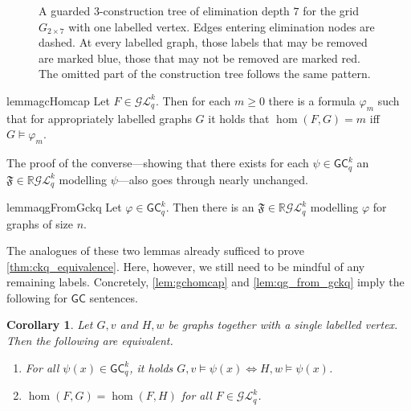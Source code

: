 \documentclass[10pt,a4paper]{article}
\newtheorem{corollary}[theorem]{Corollary}
\newcommand{\R}{\ensuremath{\mathbb{R}}}
\newcommand{\Lkq}{\ensuremath{\mathcal{L}_{q}^{k}}}
\newcommand{\GEkq}{\ensuremath{\mathcal{G}\Lkq}}
\newcommand{\lGC}{\ensuremath{\mathsf{GC}}}
\newcommand{\qg}[1]{\ensuremath{\mathfrak{#1}}} \newcommand{\qgp}[3]{\ensuremath{\mathfrak{#1}[#3; #2]}}
\newcommand{\grid}[2]{\ensuremath{G_{#1 \times #2}}}
\begin{document}
\begin{figure}
  \caption{A guarded $3$-construction tree of elimination depth $7$ for the grid $\grid{2}{7}$ with one labelled vertex. Edges entering elimination nodes are dashed. At every labelled graph, those labels that may be removed are marked blue, those that may not be removed are marked red. The omitted part of the construction tree follows the same pattern.}
  \label{fig:guard-elim-example}
\end{figure}

 


\begin{restatable}{lemma}{gcHomcap}\label{lem:gchomcap}
  Let $F \in \GEkq$. Then for each $m \geq 0$ there is a formula $\varphi_m$ such that for appropriately labelled graphs $G$ it holds that $\hom(F, G) = m$ iff $G \models \varphi_m$.
\end{restatable}

  The proof of the converse---showing that there exists for each $\psi \in \lGC^k_q$ an $\qg{F} \in \R\GEkq$ modelling $\psi$---also goes through nearly unchanged.

\begin{restatable}{lemma}{qgFromGckq}\label{lem:qg_from_gckq}
  Let $\varphi \in \lGC^k_q$. Then there is an $\qg{F} \in \R\GEkq$ modelling $\varphi$ for graphs of size $n$.
\end{restatable}

The analogues of these two lemmas already sufficed to prove \cref{thm:ckq_equivalence}. Here, however, we still need to be mindful of any remaining labels. Concretely, \cref{lem:gchomcap} and \cref{lem:qg_from_gckq} imply the following for $\lGC$ sentences.

\begin{corollary}\label{cor:gc-thm-with-labels}
  Let $G, v$ and $H, w$ be graphs together with a single labelled vertex. Then the following are equivalent.
  \begin{enumerate}
    \item For all $\psi(x) \in \lGC^k_q$, it holds $G, v \models \psi(x) \iff H, w \models \psi(x)$.
    \item $\hom(F, G) = \hom(F, H)$ for all $F \in \GEkq$.
  \end{enumerate}
\end{corollary}
\end{document}
